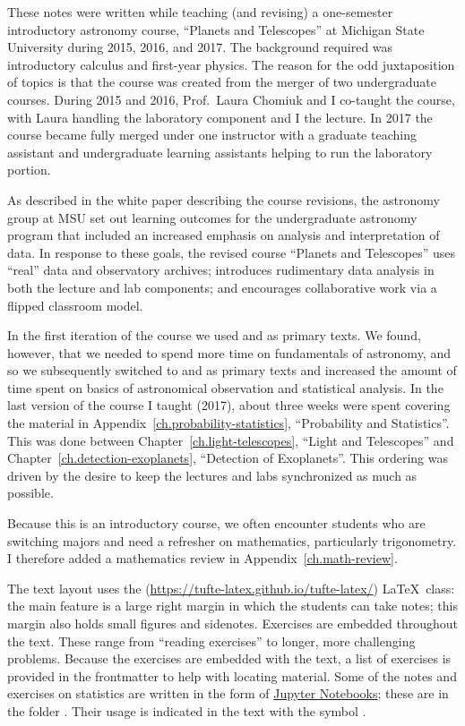 
These notes were written while teaching (and revising) a one-semester introductory astronomy course, ``Planets and Telescopes'' at Michigan State University during 2015, 2016, and 2017. The background required was  introductory calculus and first-year physics. The reason for the odd juxtaposition of topics is that the course was created from the merger of two undergraduate courses. During 2015 and 2016, Prof.\ Laura Chomiuk and I co-taught the course, with Laura handling the laboratory component and I the lecture. In 2017 the course became fully merged under one instructor with a graduate teaching assistant and undergraduate learning assistants helping to run the laboratory portion.

As described in the white paper describing the course revisions\cite{BrownDevelopment-of-}, the astronomy group at MSU set out learning outcomes for the undergraduate astronomy program that included an increased emphasis on analysis and interpretation of data.
In response to these goals, the revised course ``Planets and Telescopes'' uses ``real'' data and observatory archives; introduces rudimentary data analysis in both the lecture and lab components; and encourages collaborative work via a flipped classroom model.

In the first iteration of the course we used  and  as primary texts. We found, however, that we needed to spend more time on fundamentals of astronomy, and so we subsequently switched to  and  as primary texts and increased the amount of time spent on basics of astronomical observation and statistical analysis. In the last version of the course I taught (2017), about three weeks were spent covering the material in Appendix~\ref{ch.probability-statistics}, ``Probability and Statistics''. This was done between Chapter~\ref{ch.light-telescopes}, ``Light and Telescopes'' and Chapter~\ref{ch.detection-exoplanets}, ``Detection of Exoplanets''.  This ordering was driven by the desire to keep the lectures and labs synchronized as much as possible.

Because this is an introductory course, we often encounter students who are switching majors and need a refresher on mathematics, particularly trigonometry. I therefore added a mathematics review in Appendix~\ref{ch.math-review}.

The text layout uses the  (\url{https://tufte-latex.github.io/tufte-latex/}) \LaTeX\ class:  the main feature is a large right margin in which the students can take notes; this margin also holds small figures and sidenotes. Exercises are embedded throughout the text.  These range from ``reading exercises'' to longer, more challenging problems.  Because the exercises are embedded with the text, a list of exercises is provided in the frontmatter to help with locating material. Some of the notes and exercises on statistics are written in the form of \href{http://jupyter.org}{Jupyter Notebooks}; these are in the folder . Their usage is indicated in the text with the symbol \notebook.

